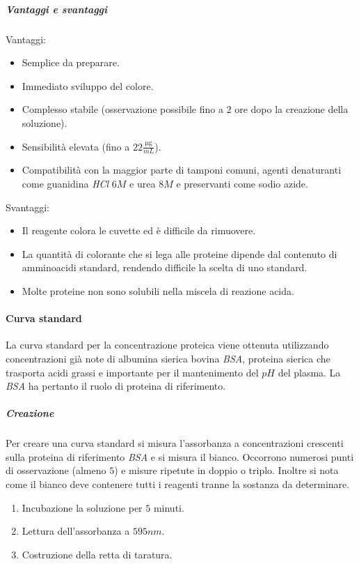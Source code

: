 				\subparagraph{Vantaggi e svantaggi}\mbox{}
				\begin{multicols}{2}
					Vantaggi:
					\begin{itemize}
						\item Semplice da preparare.
						\item Immediato sviluppo del colore.
						\item Complesso stabile (osservazione possibile fino a $2$ ore dopo la creazione della soluzione).
						\item Sensibilit\`a elevata (fino a $22\frac{\si{\micro\gram}}{\si{mL}}$).
						\item Compatibilit\`a con la maggior parte di tamponi comuni, agenti denaturanti come guanidina \emph{HCl} $6M$ e urea $8M$ e preservanti come sodio azide.
					\end{itemize}
					\columnbreak
					Svantaggi:
					\begin{itemize}
						\item Il reagente colora le cuvette ed \`e difficile da rimuovere.
						\item La quantit\`a di colorante che si lega alle proteine dipende dal contenuto di amminoacidi standard, rendendo difficile la scelta di uno standard.
						\item Molte proteine non sono solubili nella miscela di reazione acida.
					\end{itemize}
				\end{multicols}

			\paragraph{Curva standard}
			La curva standard per la concentrazione proteica viene ottenuta utilizzando concentrazioni gi\`a note di albumina sierica bovina \emph{BSA}, proteina sierica che trasporta acidi grassi e importante per il mantenimento del $pH$ del plasma.
			La \emph{BSA} ha pertanto il ruolo di proteina di riferimento.
			
				\subparagraph{Creazione}
				Per creare una curva standard si misura l'assorbanza a concentrazioni crescenti sulla proteina di riferimento \emph{BSA} e si misura il bianco.
				Occorrono numerosi punti di osservazione (almeno $5$) e misure ripetute in doppio o triplo.
				Inoltre si nota come il bianco deve contenere tutti i reagenti tranne la sostanza da determinare.
		\begin{multicols}{2}
				\begin{enumerate}
					\item Incubazione la soluzione per $5$ minuti.
					\item Lettura dell'assorbanza a $595\si{nm}$.
					\item Costruzione della retta di taratura.
				\end{enumerate}
			\end{multicols}

